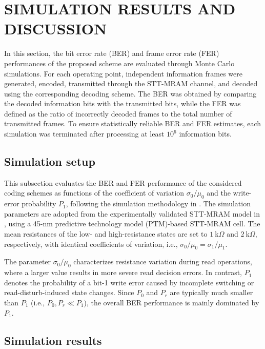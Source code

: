 \documentclass[conference]{IEEEtran}
\begin{document}
\section{SIMULATION RESULTS AND DISCUSSION} \label{section_simulation}

In this section, the bit error rate (BER) and frame error rate (FER) performances of the proposed scheme are evaluated through Monte Carlo simulations. For each operating point, independent information frames were generated, encoded, transmitted through the STT-MRAM channel, and decoded using the corresponding decoding scheme. The BER was obtained by comparing the decoded information bits with the transmitted bits, while the FER was defined as the ratio of incorrectly decoded frames to the total number of transmitted frames. To ensure statistically reliable BER and FER estimates, each simulation was terminated after processing at least $10^6$ information bits.


\subsection{Simulation setup}

This subsection evaluates the BER and FER performance of the considered coding schemes as functions of the coefficient of variation $\sigma_0/\mu_0$ and the write-error probability $P_1$, following the simulation methodology in \cite{an2025sparse,nguyen2021design}. The simulation parameters are adopted from the experimentally validated STT-MRAM model in \cite{cai2017cascaded,zhang2011stt}, using a 45-nm predictive technology model (PTM)-based STT-MRAM cell. The mean resistances of the low- and high-resistance states are set to $1~\mathrm{k}\Omega$ and $2~\mathrm{k}\Omega$, respectively, with identical coefficients of variation, i.e., $\sigma_0/\mu_0=\sigma_1/\mu_1$.

The parameter $\sigma_0/\mu_0$ characterizes resistance variation during read operations, where a larger value results in more severe read decision errors. In contrast, $P_1$ denotes the probability of a bit-1 write error caused by incomplete switching or read-disturb-induced state changes. Since $P_0$ and $P_r$ are typically much smaller than $P_1$ (i.e., $P_0,P_r\ll P_1$), the overall BER performance is mainly dominated by $P_1$.



\subsection{Simulation results}
\end{document}
